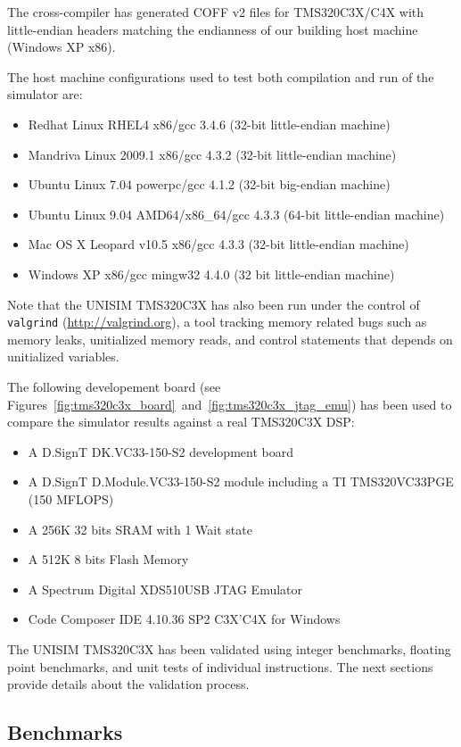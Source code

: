 The cross-compiler has generated COFF v2 files for TMS320C3X/C4X with little-endian headers matching the endianness of our building host machine (Windows XP x86).

\noindent The host machine configurations used to test both compilation and run of the simulator are:
\begin{itemize}
\item Redhat Linux RHEL4 x86/gcc 3.4.6 (32-bit little-endian machine)
\item Mandriva Linux 2009.1 x86/gcc 4.3.2 (32-bit little-endian machine)
\item Ubuntu Linux 7.04 powerpc/gcc 4.1.2 (32-bit big-endian machine)
\item Ubuntu Linux 9.04 AMD64/x86\_64/gcc 4.3.3 (64-bit little-endian machine)
\item Mac OS X Leopard v10.5 x86/gcc 4.3.3 (32-bit little-endian machine)
\item Windows XP x86/gcc mingw32 4.4.0 (32 bit little-endian machine)
\end{itemize}

Note that the UNISIM TMS320C3X has also been run under the control of \texttt{valgrind} (\url{http://valgrind.org}), a tool tracking memory related bugs such as memory leaks, unitialized memory reads, and control statements that depends on unitialized variables.

The following developement board (see Figures~\ref{fig:tms320c3x_board}~and~\ref{fig:tms320c3x_jtag_emu}) has been used to compare the simulator results against a real TMS320C3X DSP:
\begin{itemize}
\item A D.SignT DK.VC33-150-S2 development board
\item A D.SignT D.Module.VC33-150-S2 module including a TI TMS320VC33PGE (150 MFLOPS)
\item A 256K 32 bits SRAM with 1 Wait state
\item A 512K 8 bits Flash Memory
\item A Spectrum Digital XDS510USB JTAG Emulator
\item Code Composer IDE 4.10.36 SP2 C3X'C4X for Windows
\end{itemize}

The UNISIM TMS320C3X has been validated using integer benchmarks, floating point benchmarks, and unit tests of individual instructions.
The next sections provide details about the validation process.

\subsection{Benchmarks}
\label{tms320c3x_benchmarks}

